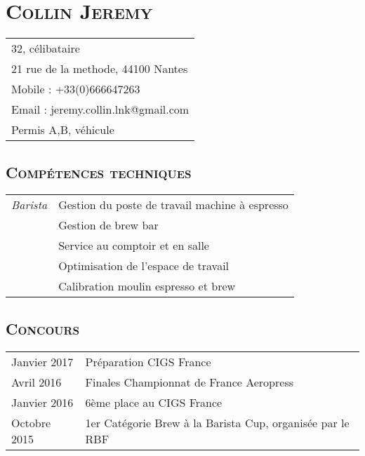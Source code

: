 \documentclass[a4paper]{article}
\newcommand{\hsection}[1]{\section*{\fontfamily{phv}\selectfont\textsc{#1}}}
\newcommand{\hsubsection}[1]{\subsection*{\fontfamily{phv}\selectfont\textsc{#1}}}
\begin{document}
\selectfont
\hsection{Collin Jeremy}
\begin{tabular}{p{16.5cm}}
\hline
32, célibataire\\
21 rue de la methode, 44100 Nantes\\
Mobile : +33(0)666647263\\
Email : jeremy.collin.lnk@gmail.com\\
Permis A,B, véhicule\\
\end{tabular}
\hsubsection{Compétences techniques}
\begin{tabular}{P{3.5cm}|p{13cm}}
\textsl{Barista} & Gestion du poste de travail machine à espresso\\
 & Gestion de brew bar\\
 & Service au comptoir et en salle\\
 & Optimisation de l’espace de travail\\
 & Calibration moulin espresso et brew\\
%
\end{tabular}

\hsubsection{Concours}
\begin{tabular}{P{3.5cm}|p{13cm}}
Janvier 2017  & Préparation CIGS France\\
Avril 2016      & Finales Championnat de France Aeropress\\
Janvier 2016    & 6ème place au CIGS France\\
Octobre 2015    & 1er Catégorie Brew à la Barista Cup, organisée par le RBF\\
\end{tabular}
\end{document}
